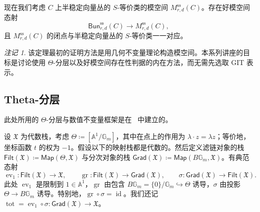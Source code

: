 \documentclass{amsart}
\theoremstyle{definition}
\theoremstyle{remark}
\newtheorem{rmk}[thm]{注记}
\theoremstyle{plain}
\theoremstyle{definition}
\theoremstyle{remark}
\newcommand{\A}{\mathbb{A}}
\newcommand{\G}{\mathbb{G}}
\newcommand{\mf}[1]{\mathfrak{#1}}
\newcommand{\mr}[1]{\mathrm{#1}}
\newcommand{\on}[1]{\operatorname{#1}}
\newcommand{\ms}[1]{\mathsf{#1}}
\newcommand{\1}{\mathbf{1}}
\newcommand{\2}{\mathbf{2}}
\newcommand{\3}{\mathbf{3}}
\DeclareMathOperator{\ev}{ev}
\begin{document}
现在我们考虑 \(C\) 上半稳定向量丛的 \(S\)-等价类的模空间 \(M_{r,d}^{\mr{ss}}(C)\)。存在好模空间态射
\[
    \ms{Bun}_{r,d}^{\mr{ss}}(C)\longrightarrow M_{r,d}^{\mr{ss}}(C),
\]
且 \(M_{r,d}^{\mr{ss}}(C)\) 的闭点与半稳定向量丛的 \(S\)-等价类一一对应。

\begin{rmk}
    该定理最初的证明方法是用几何不变量理论构造模空间。本系列讲座的目标是讨论使用 \(\Theta\)-分层以及好模空间存在性判据的内在方法，而无需先选取 GIT 表示。
\end{rmk}


\subsection{Theta-分层}%
\label{sub:Theta-stratifications}

此处所用的 \(\Theta\)-分层与数值不变量框架是在~\cite{HLinstability} 中建立的。

设 \(\mf{X}\) 为代数栈，考虑 \(\Theta\coloneqq[\A^1/\G_m]\)，其中在点上的作用为 \(\lambda\cdot z=\lambda z\)；等价地，坐标函数 \(t\) 的权为 \(-1\)。假设以下的映射栈都是代数的。然后定义滤链对象的栈 \(\ms{Filt}(\mf{X})\coloneqq\ms{Map}(\Theta,\mf{X})\) 与分次对象的栈 \(\ms{Grad}(\mf{X})\coloneqq\ms{Map}(B\G_m,\mf{X})\)。有典范态射
\[
    \ev_1\colon\ms{Filt}(\mf{X})\to\mf{X},
    \qquad
    \on{gr}\colon\ms{Filt}(\mf{X})\to\ms{Grad}(\mf{X}),
    \qquad
    \sigma\colon\ms{Grad}(\mf{X})\to\ms{Filt}(\mf{X}).
\]
此处 \(\ev_1\) 是限制到 \(1\in\A^1\)，\(\on{gr}\) 由包含 \(B\G_m=\{0\}/\G_m\hookrightarrow\Theta\) 诱导，\(\sigma\) 由投影 \(\Theta\to B\G_m\) 诱导。特别地，\(\on{gr}\circ\sigma=\on{id}\)。我们还记 \(\on{tot}=\ev_1\circ\sigma\colon\ms{Grad}(\mf{X})\to\mf{X}\)。
\end{document}
